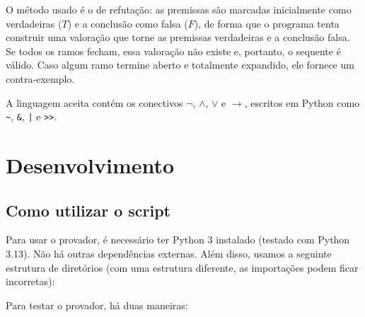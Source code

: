 \documentclass[12pt,a4paper]{article}
\begin{document}
\noindent O método usado é o de refutação: as premissas são marcadas inicialmente como verdadeiras ($T$) e a conclusão como falsa ($F$), de forma que o programa tenta construir uma valoração que torne as premissas verdadeiras e a conclusão falsa. Se todos os ramos fecham, essa valoração não existe e, portanto, o sequente é válido. Caso algum ramo termine aberto e totalmente expandido, ele fornece um contra-exemplo.

\noindent A linguagem aceita contém os conectivos $\neg$, $\wedge$, $\vee$ e $\rightarrow$, escritos em Python como \texttt{\textasciitilde}, \texttt{\&}, \texttt{|} e \texttt{>>}.

\section{Desenvolvimento}

\subsection{Como utilizar o script}

Para usar o provador, é necessário ter Python 3 instalado (testado com Python 3.13). Não há outras dependências externas. Além disso, usamos a seguinte estrutura de diretórios (com uma estrutura diferente, as importações podem ficar incorretas):


\bigskip
\noindent Para testar o provador, há duas maneiras:
\end{document}
